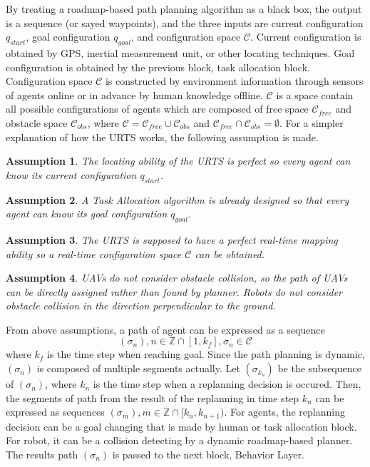 \documentclass{ieeeaccess}
\newtheorem{assumption}{Assumption}[section]
\begin{document}
By treating a roadmap-based path planning algorithm as a black box, the output is a sequence (or sayed waypoints), and the three inputs are current configuration $q_{start}$, goal configuration $q_{goal}$, and configuration space $\mathcal{C}$. Current configuration is obtained by GPS, inertial measurement unit, or other locating techniques. Goal configuration is obtained by the previous block, task allocation block. Configuration space $\mathcal{C}$ is constructed by environment information through sensors of agents online or in advance by human knowledge offline. $\mathcal{C}$ is a space contain all possible configurations of agents which are composed of free space $\mathcal{C}_{free}$ and obstacle space $\mathcal{C}_{obs}$, where $\mathcal{C}=\mathcal{C}_{free}\cup\mathcal{C}_{obs}$ and $\mathcal{C}_{free}\cap\mathcal{C}_{obs}=\emptyset$. For a simpler explanation of how the URTS works, the following assumption is made.

\begin{assumption}
    The locating ability of the URTS is perfect so every agent can know its current configuration $q_{start}$.
\end{assumption}
\begin{assumption}
    A Task Allocation algorithm is already designed so that every agent can know its goal configuration $q_{goal}$.
\end{assumption}
\begin{assumption}
    The URTS is supposed to have a perfect real-time mapping ability so a real-time configuration space $\mathcal{C}$ can be obtained.
\end{assumption}
\begin{assumption} \label{asm:collision} %
    UAVs do not consider obstacle collision, so the path of UAVs can be directly assigned rather than found by planner. Robots do not consider obstacle collision in the direction perpendicular to the ground. 
\end{assumption}

From above assumptions, a path of agent can be expressed as a sequence
\begin{equation}
    (\sigma_n), n\in\mathbb{Z}\cap[1,k_f], \sigma_n\in\mathcal{C}
\end{equation}
where $k_f$ is the time step when reaching goal. Since the path planning is dynamic, $(\sigma_n)$ is composed of multiple segments actually. Let $(\sigma_{k_n})$ be the subsequence of $(\sigma_n)$, where $k_n$ is the time step when a replanning decision is occured. Then, the segments of path from the result of the replanning in time step $k_n$ can be expressed as sequences $(\sigma_m), m\in\mathbb{Z}\cap[k_n, k_{n+1})$. For agents, the replanning decision can be a goal changing that is made by human or task allocation block. For robot, it can be a collision detecting by a dynamic roadmap-based planner. The results path $(\sigma_n)$ is passed to the next block, Behavior Layer.
\end{document}
